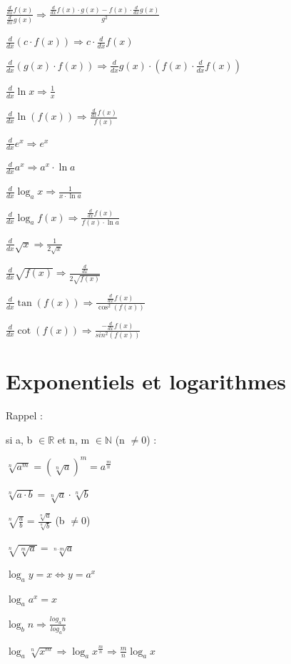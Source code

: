 \documentclass[a4paper,12pt]{article}
\newcommand\tab[1][]{\hspace*{#1}}
\begin{document}
$\frac{\frac{d}{dx} f(x)}{\frac{d}{dx} g(x)} \Rightarrow \frac{\frac{d}{dx} f(x)\cdot g(x)-f(x)\cdot \frac{d}{dx} g(x)}{g^2}$

$\frac{d}{dx}(c \cdot f(x)) \Rightarrow c \cdot \frac{d}{dx} f(x)$

$\frac{d}{dx} (g(x) \cdot f(x)) \Rightarrow \frac{d}{dx} g(x) \cdot (f(x) \cdot \frac{d}{dx} f(x))$

$\frac{d}{dx} \ln x \Rightarrow \frac{1}{x}$

$\frac{d}{dx} \ln (f(x)) \Rightarrow \frac{\frac{d}{dx} f(x)}{f(x)}$

$\frac{d}{dx} e^{x} \Rightarrow e^{x}$

$\frac{d}{dx} a^{x} \Rightarrow a^{x} \cdot  \ln a$

$\frac{d}{dx} \log_{a} x \Rightarrow \frac{1}{x \cdot \ln a}$

$\frac{d}{dx} \log_{a} f(x) \Rightarrow \frac{\frac{d}{dx} f(x)}{f(x) \cdot \ln a}$

$\frac{d}{dx} \sqrt{x} \Rightarrow \frac{1}{2\sqrt{x}}$

$\frac{d}{dx} \sqrt{f(x)} \Rightarrow \frac{\frac{d}{dx}}{2\sqrt{f(x)}}$

$\frac{d}{dx} \tan(f(x)) \Rightarrow \frac{\frac{d}{dx} f(x)}{\cos^2 (f(x))}$

$\frac{d}{dx}  \cot(f(x))\Rightarrow \frac{-\frac{d}{dx} f(x)}{sin^2(f(x))}$

\newpage
\section{Exponentiels et logarithmes}

Rappel :

si a, b $\in \mathbb{R}$ et n, m $\in \mathbb{N}$ (n $\neq 0$) :

$\sqrt[n]{a^m} = (\sqrt[n]{a})^m = a^{\frac{m}{n}}$

$\sqrt[n]{a\cdot b} = \sqrt[n]{a} \cdot \sqrt[n]{b}$

$\sqrt[n]{\frac{a}{b}} =  \frac{\sqrt[n]{a}}{\sqrt[n]{b}}$ \tab[.5cm](b $\neq 0$)

$\sqrt[n]{\sqrt[m]{a}} = \sqrt[n\cdot m]{a}$

\vspace{\baselineskip}
$\log_a y = x \Leftrightarrow y=a^x$

$\log_a a^x = x$

$\log_b n \Rightarrow  \frac{log_a n}{log_a b}$

$\log_a \sqrt[n]{x^m} \Rightarrow \log_a x^{\frac{m}{n}} \Rightarrow \frac{m}{n} \log_a x$
\end{document}
